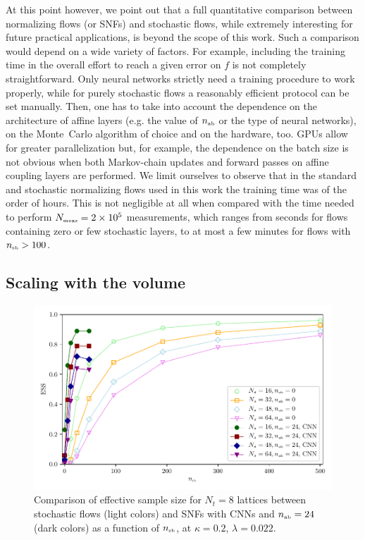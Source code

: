 \documentclass[11pt]{article}
\newcommand{\nab}{n_{\mbox{\tiny{ab}}}}
\newcommand{\nsb}{n_{\mbox{\tiny{sb}}}}
\newcommand{\nmeas}{N_{\mbox{\tiny{meas}}}}
\begin{document}
At this point however, we point out that a full quantitative comparison between normalizing flows (or SNFs) and stochastic flows, while extremely interesting for future practical applications, is beyond the scope of this work. Such a comparison would depend on a wide variety of factors. For example, including the training time in the overall effort to reach a given error on $f$ is not completely straightforward. Only neural networks strictly need a training procedure to work properly, while for purely stochastic flows a reasonably efficient protocol can be set manually. Then, one has to take into account the dependence on the architecture of affine layers (e.g. the value of $\nab$ or the type of neural networks), on the Monte~Carlo algorithm of choice and on the hardware, too. GPUs allow for greater parallelization but, for example, the dependence on the batch size is not obvious when both Markov-chain updates and forward passes on affine coupling layers are performed. We limit ourselves to observe that in the standard and stochastic normalizing flows used in this work the training time was of the order of hours. This is not negligible at all when compared with the time needed to perform $\nmeas=2\times 10^5$ measurements, which ranges from seconds for flows containing zero or few stochastic layers, to at most a few minutes for flows with $\nsb > 100$.

\subsection{Scaling with the volume}

\begin{figure}[!htb]
\begin{center}
\includegraphics*[width=\textwidth]{ESS_vol.pdf}
\caption{Comparison of effective sample size for $N_t = 8$ lattices between stochastic flows (light colors) and SNFs with CNNs and $\nab=24$ (dark colors) as a function of $\nsb$, at $\kappa=0.2$, $\lambda=0.022$. \label{fig:ESS_vol}}
\end{center}
\end{figure}
\end{document}
